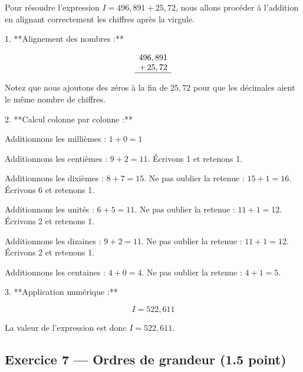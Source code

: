 \documentclass[answers]{exam}
\begin{document}
\begin{solution}
Pour résoudre l'expression \( I = 496,891 + 25,72 \), nous allons procéder à l'addition en alignant correctement les chiffres après la virgule.

1. **Alignement des nombres :**

   \[
   \begin{array}{r}
       496,891 \\
   + \, 25,72 \\
   \hline
   \end{array}
   \]

   Notez que nous ajoutons des zéros à la fin de \(25,72\) pour que les décimales aient le même nombre de chiffres.

2. **Calcul colonne par colonne :**
   \begin{compactitem}
       \item Additionnons les millièmes : \(1 + 0 = 1\)
       \item Additionnons les centièmes : \(9 + 2 = 11\). Écrivons 1 et retenons 1.
       \item Additionnons les dixièmes : \(8 + 7 = 15\). Ne pas oublier la retenue : \(15 + 1 = 16\). Écrivons 6 et retenons 1.
       \item Additionnons les unités : \(6 + 5 = 11\). Ne pas oublier la retenue : \(11 + 1 = 12\). Écrivons 2 et retenons 1.
       \item Additionnons les dizaines : \(9 + 2 = 11\). Ne pas oublier la retenue : \(11 + 1 = 12\). Écrivons 2 et retenons 1.
       \item Additionnons les centaines : \(4 + 0 = 4\). Ne pas oublier la retenue : \(4 + 1 = 5\).
   \end{compactitem}

3. **Application numérique :**

   \[
   I = 522,611
   \]

La valeur de l'expression est donc \( I = \boxed{522,611} \).
\end{solution}

\subsection*{Exercice 7 — Ordres de grandeur (1.5 point)}
\end{document}
